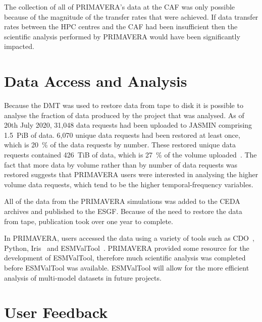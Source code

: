 \documentclass[gmd, manuscript]{copernicus}
\begin{document}
The collection of all of PRIMAVERA's data at the CAF was only possible because of the magnitude of the transfer rates that were achieved. If data transfer rates between the HPC centres and the CAF had been insufficient then the scientific analysis performed by PRIMAVERA would have been significantly impacted.

\section{Data Access and Analysis}

Because the DMT was used to restore data from tape to disk it is possible to analyse the fraction of data produced by the project that was analysed. As of 20th July 2020, 31,048 data requests had been uploaded to JASMIN comprising 1.5~PiB of data. 6,070 unique data requests had been restored at least once, which is 20~\% of the data requests by number. These restored unique data requests contained 426~TiB of data, which is 27~\% of the volume uploaded~\citep{Seddon2020b}. The fact that more data by volume rather than by number of data requests was restored suggests that PRIMAVERA users were interested in analysing the higher volume data requests, which tend to be the higher temporal-frequency variables.

All of the data from the PRIMAVERA simulations was added to the CEDA archives and published to the ESGF. Because of the need to restore the data from tape, publication took over one year to complete.

In PRIMAVERA, users accessed the data using a variety of tools such as CDO~\citep{schulzweida_uwe_2022_7112925}, Python, Iris~\citep{Iris} and ESMValTool~\citep{Righi2020}. PRIMAVERA provided some resource for the development of ESMValTool, therefore much scientific analysis was completed before ESMValTool was available. ESMValTool will allow for the more efficient analysis of multi-model datasets in future projects.

\section{User Feedback}
\end{document}
